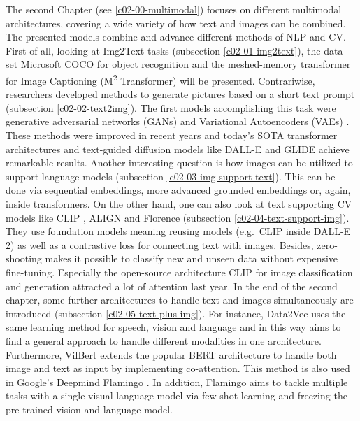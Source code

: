 \documentclass[
]{krantz}
\begin{document}
The second Chapter (see \ref{c02-00-multimodal}) focuses on different multimodal architectures, covering a wide variety of how text and images can be combined. The presented models combine and advance different methods of NLP and CV. First of all, looking at Img2Text tasks (subsection \ref{c02-01-img2text}), the data set Microsoft COCO for object recognition \citep{COCO} and the meshed-memory transformer for Image Captioning (M\textsuperscript{2} Transformer) \citep{meshed_memory} will be presented. Contrariwise, researchers developed methods to generate pictures based on a short text prompt (subsection \ref{c02-02-text2img}). The first models accomplishing this task were generative adversarial networks (GANs) \citep{GAN} and Variational Autoencoders (VAEs) \citep{VAE}. These methods were improved in recent years and today's SOTA transformer architectures and text-guided diffusion models like DALL-E \citep{DALLE} and GLIDE \citep{GLIDE} achieve remarkable results. Another interesting question is how images can be utilized to support language models (subsection \ref{c02-03-img-support-text}). This can be done via sequential embeddings, more advanced grounded embeddings or, again, inside transformers. On the other hand, one can also look at text supporting CV models like CLIP \citep{CLIP}, ALIGN \citep{ALIGN} and Florence \citep{yuan2021florence} (subsection \ref{c02-04-text-support-img}). They use foundation models meaning reusing models (e.g.~CLIP inside DALL-E 2) as well as a contrastive loss for connecting text with images. Besides, zero-shooting makes it possible to classify new and unseen data without expensive fine-tuning. Especially the open-source architecture CLIP \citep{CLIP} for image classification and generation attracted a lot of attention last year. In the end of the second chapter, some further architectures to handle text and images simultaneously are introduced (subsection \ref{c02-05-text-plus-img}). For instance, Data2Vec uses the same learning method for speech, vision and language and in this way aims to find a general approach to handle different modalities in one architecture. Furthermore, VilBert \citep{VilBert} extends the popular BERT architecture to handle both image and text as input by implementing co-attention. This method is also used in Google's Deepmind Flamingo \citep{Flamingo}. In addition, Flamingo aims to tackle multiple tasks with a single visual language model via few-shot learning and freezing the pre-trained vision and language model.
\end{document}
